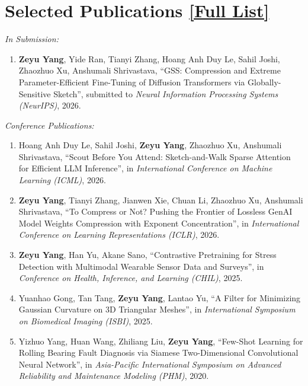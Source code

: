 \documentclass[11pt]{article}
\begin{document}
\section*{Selected Publications \hfill \href{https://scholar.google.com/citations?user=CaKsmnUAAAAJ&hl=en}{[Full List]}}

\textit{In Submission:}

\begin{enumerate}
    \item \label{anshu-lluf} \textbf{Zeyu Yang}, Yide Ran, Tianyi Zhang, Hoang Anh Duy Le, Sahil Joshi, Zhaozhuo Xu, Anshumali Shrivastava, ``GSS: Compression and Extreme Parameter-Efficient Fine-Tuning of Diffusion Transformers via Globally-Sensitive Sketch'', submitted to \textit{Neural Information Processing Systems (NeurIPS)}, 2026.
\end{enumerate}

\vspace{\lineskip}

\textit{Conference Publications:}

\begin{enumerate}[resume]
    \item \label{anshu-scout} Hoang Anh Duy Le, Sahil Joshi, \textbf{Zeyu Yang}, Zhaozhuo Xu, Anshumali Shrivastava, ``Scout Before You Attend: Sketch-and-Walk Sparse Attention for Efficient LLM Inference'', in \textit{International Conference on Machine Learning (ICML)}, 2026.
    \item \label{anshu-fp8-compression} \textbf{Zeyu Yang}, Tianyi Zhang, Jianwen Xie, Chuan Li, Zhaozhuo Xu, Anshumali Shrivastava, ``To Compress or Not? Pushing the Frontier of Lossless GenAI Model Weights Compression with Exponent Concentration'', in \textit{International Conference on Learning Representations (ICLR)}, 2026.
    \item \label{akane-clsp} \textbf{Zeyu Yang}, Han Yu, Akane Sano, ``Contrastive Pretraining for Stress Detection with Multimodal Wearable Sensor Data and Surveys'', in \textit{Conference on Health, Inference, and Learning (CHIL)}, 2025.
    \item Yuanhao Gong, Tan Tang, \textbf{Zeyu Yang}, Lantao Yu, ``A Filter for Minimizing Gaussian Curvature on 3D Triangular Meshes'', in \textit{International Symposium on Biomedical Imaging (ISBI)}, 2025.
    \item Yizhuo Yang, Huan Wang, Zhiliang Liu, \textbf{Zeyu Yang},
    ``Few-Shot Learning for Rolling Bearing Fault Diagnosis via Siamese Two-Dimensional Convolutional Neural Network'',
    in \textit{Asia-Pacific International Symposium on Advanced Reliability and Maintenance Modeling (PHM)}, 2020.
\end{enumerate}
\end{document}
